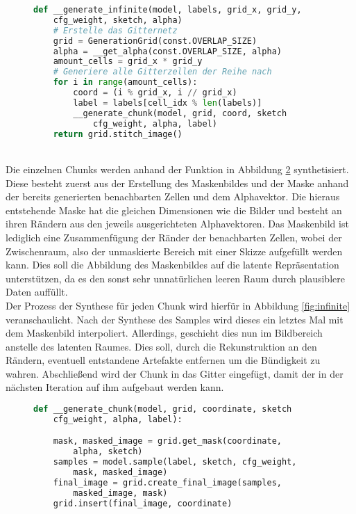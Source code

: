 \begin{figure}[htbp]
\begin{lstlisting}[language=python]
def __generate_infinite(model, labels, grid_x, grid_y,
    cfg_weight, sketch, alpha)
    # Erstelle das Gitternetz
    grid = GenerationGrid(const.OVERLAP_SIZE)
    alpha = __get_alpha(const.OVERLAP_SIZE, alpha)
    amount_cells = grid_x * grid_y
    # Generiere alle Gitterzellen der Reihe nach
    for i in range(amount_cells):
        coord = (i % grid_x, i // grid_x)
        label = labels[cell_idx % len(labels)]
        __generate_chunk(model, grid, coord, sketch
            cfg_weight, alpha, label)
    return grid.stitch_image()
\end{lstlisting}
    \captionsetup{type=figure}
    \label{fig:gen_infinite}
\end{figure} \\
Die einzelnen Chunks werden anhand der Funktion in Abbildung \ref{fig:gen_chunk} synthetisiert. Diese besteht zuerst aus der Erstellung des Maskenbildes und der Maske anhand der bereits generierten benachbarten Zellen und dem Alphavektor. Die hieraus entstehende Maske hat die gleichen Dimensionen wie die Bilder und besteht an ihren Rändern aus den jeweils ausgerichteten Alphavektoren. Das Maskenbild ist lediglich eine Zusammenfügung der Ränder der benachbarten Zellen, wobei der Zwischenraum, also der unmaskierte Bereich mit einer Skizze aufgefüllt werden kann. Dies soll die Abbildung des Maskenbildes auf die latente Repräsentation unterstützen, da es den sonst sehr unnatürlichen leeren Raum durch plausiblere Daten auffüllt. \\
Der Prozess der Synthese für jeden Chunk wird hierfür in Abbildung \ref{fig:infinite} veranschaulicht.
Nach der Synthese des Samples wird dieses ein letztes Mal mit dem Maskenbild interpoliert. Allerdings, geschieht dies nun im Bildbereich anstelle des latenten Raumes. Dies soll, durch die Rekunstruktion an den Rändern, eventuell entstandene Artefakte entfernen um die Bündigkeit zu wahren. Abschließend wird der Chunk in das Gitter eingefügt, damit der in der nächsten Iteration auf ihm aufgebaut werden kann.
\begin{figure}[htbp]
\begin{lstlisting}[language=python]
def __generate_chunk(model, grid, coordinate, sketch
    cfg_weight, alpha, label):

    mask, masked_image = grid.get_mask(coordinate, 
        alpha, sketch)
    samples = model.sample(label, sketch, cfg_weight,
        mask, masked_image)
    final_image = grid.create_final_image(samples, 
        masked_image, mask)
    grid.insert(final_image, coordinate)
\end{lstlisting}
    \captionsetup{type=figure}
    \label{fig:gen_chunk}
\end{figure}



